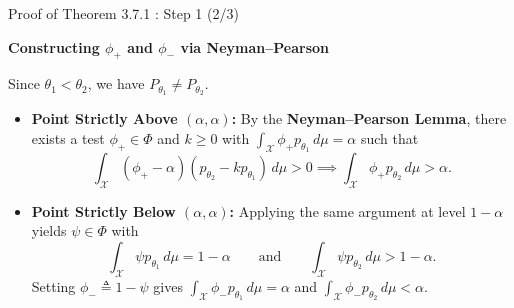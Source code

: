 \documentclass[10pt, aspectratio=169, xcolor=dvipsnames]{beamer}
\newcommand{\lead}[1]{{\color{UniBlue}\bfseries #1}}
\begin{document}
\begin{frame}{Proof of Theorem 3.7.1 : Step 1 (2/3)}
    
    \lead{Constructing $\phi_+$ and $\phi_-$ via Neyman--Pearson}\\
    \vspace{0.2cm}
    
    \color{Slate}
    Since $\theta_1 < \theta_2$, we have $P_{\theta_1} \neq P_{\theta_2}$.
    \vspace{0.15cm}
    \begin{itemize}
        \setlength\itemsep{8pt}
        \item[\textcolor{Teal}{\textbullet}] \textbf{Point Strictly Above $(\alpha, \alpha)$:} By the \textbf{Neyman--Pearson Lemma}, there exists a test $\phi_+ \in \Phi$ and $k \ge 0$ with $\displaystyle \int_{\mathcal{X}} \phi_+ p_{\theta_1}\, d\mu = \alpha$ such that
        \[
            \int_{\mathcal{X}} (\phi_+ - \alpha)(p_{\theta_2} - k p_{\theta_1})\, d\mu > 0
            \implies \int_{\mathcal{X}} \phi_+ p_{\theta_2}\, d\mu > \alpha.
        \]
        
        \item[\textcolor{Teal}{\textbullet}] \textbf{Point Strictly Below $(\alpha, \alpha)$:} Applying the same argument at level $1 - \alpha$ yields $\psi \in \Phi$ with
        \[
            \int_{\mathcal{X}} \psi p_{\theta_1}\, d\mu = 1 - \alpha
            \qquad \text{and} \qquad
            \int_{\mathcal{X}} \psi p_{\theta_2}\, d\mu > 1 - \alpha.
        \]
        Setting $\phi_- \triangleq 1 - \psi$ gives $\displaystyle \int_{\mathcal{X}} \phi_- p_{\theta_1}\, d\mu = \alpha$ and $\displaystyle \int_{\mathcal{X}} \phi_- p_{\theta_2}\, d\mu < \alpha$.
    \end{itemize}
\end{frame}
\end{document}
